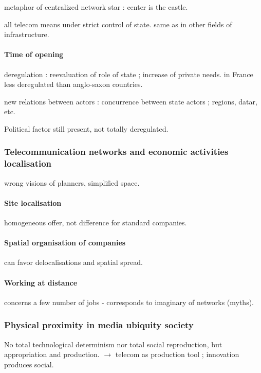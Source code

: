 metaphor of centralized network star : center is the castle.

all telecom means under strict control of state. same as in other fields of infrastructure.

\paragraph{Time of opening}

deregulation : reevaluation of role of state ; increase of private needs. in France less deregulated than anglo-saxon countries.

new relations between actors : concurrence between state actors ; regions, datar, etc.

Political factor still present, not totally deregulated.

\subsubsection*{Telecommunication networks and economic activities localisation}

wrong visions of planners, simplified space.

\paragraph{Site localisation}

homogeneous offer, not difference for standard companies.

\paragraph{Spatial organisation of companies}

can favor delocalisations and spatial spread.

\paragraph{Working at distance}

concerns a few number of jobs - corresponds to imaginary of networks (myths).

\subsubsection*{Physical proximity in media ubiquity society}

No total technological determinism nor total social reproduction, but appropriation and production. $\rightarrow$ telecom as production tool ; innovation produces social.


